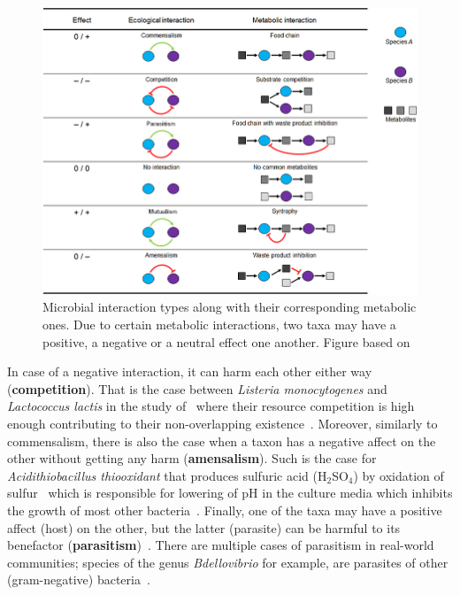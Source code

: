       \begin{figure}[!h]
         \centering
         \includegraphics[width=.9\textwidth]{figures/interaction_types.jpg}
         \caption[Microbial interactions types]{Microbial interaction types along 
         with their corresponding metabolic ones.
         Due to certain metabolic interactions, two taxa may have a positive, a negative
         or a neutral effect one another. 
         Figure based on \citep{perez2016metabolic}}
         \label{fig:micro-inter-types}
      \end{figure}

      In case of a negative interaction, it can harm each other either way (\textbf{competition}). 
      That is the case between 
      \textit{Listeria monocytogenes} and \textit{Lactococcus lactis} in the study of~\citeauthor{freilich2010large} where their resource competition is high enough
      contributing to their non-overlapping existence~\citep{freilich2010large}.
      Moreover, similarly to commensalism, 
      there is also the case when a taxon has a negative affect on the other
      without getting any harm (\textbf{amensalism}). 
      Such is the case for \textit{Acidithiobacillus thiooxidant} that produces
      sulfuric acid (H$_2$SO$_4$) by oxidation of sulfur~\citep{bobadilla2013stoichiometric} which is responsible for lowering of pH in the culture media which inhibits the growth of most other bacteria~\citep{jin2018ph}.
      Finally, one of the taxa may have a positive affect (host) on the other, but the 
      latter (parasite) can be harmful to its benefactor (\textbf{parasitism})~\citep{faust2012microbial}. 
      There are multiple cases of parasitism in real-world communities; 
      species of the genus \textit{Bdellovibrio} for example, are parasites of other (gram-negative) bacteria~\citep{stolp1979interactions}.

